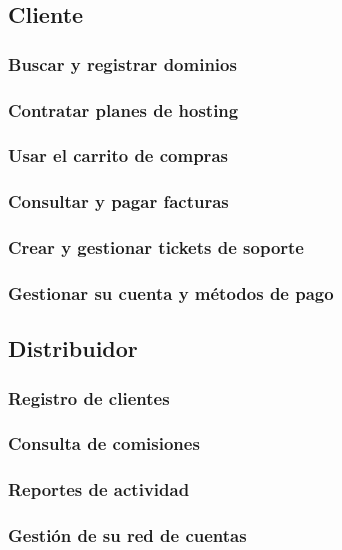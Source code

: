 \subsection{Cliente}
\subsubsection{Buscar y registrar dominios }

\subsubsection{Contratar planes de hosting }

\subsubsection{Usar el carrito de compras }

\subsubsection{Consultar y pagar facturas }

\subsubsection{Crear y gestionar tickets de soporte }

\subsubsection{Gestionar su cuenta y métodos de pago }

\subsection{Distribuidor}

\subsubsection{Registro de clientes}

\subsubsection{Consulta de comisiones}

\subsubsection{Reportes de actividad}

\subsubsection{Gestión de su red de cuentas}

